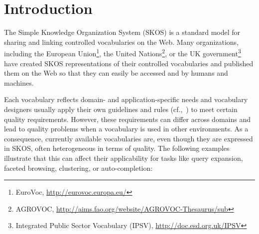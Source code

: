 
\section{Introduction}\label{sec:introduction}


The Simple Knowledge Organization System (SKOS)  is a standard model for sharing and linking controlled vocabularies on the Web. Many organizations, including the European Union\footnote{EuroVoc, \url{http://eurovoc.europa.eu/}}, the United Nations\footnote{AGROVOC, \url{http://aims.fao.org/website/AGROVOC-Thesaurus/sub}}, or the UK government\footnote{Integrated Public Sector Vocabulary (IPSV), \url{http://doc.esd.org.uk/IPSV}} have created SKOS representations of their controlled vocabularies and published them on the Web so that they can easily be accessed and by humans and machines.

Each vocabulary reflects domain- and application-specific needs and vocabulary designers usually apply their own guidelines and rules (cf.,~\cite{Coronado2009}) to meet certain quality requirements. However, these requirements can differ across domains and lead to quality problems when a vocabulary is used in other environments. As a consequence, currently available vocabularies are, even though they are expressed in SKOS, often heterogeneous in terms of quality. The following examples illustrate that this can affect their applicability for tasks like query expansion, faceted browsing, clustering, or auto-completion: 

